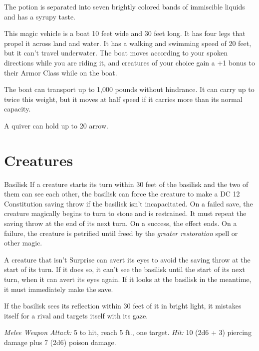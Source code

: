\documentclass[10pt,a4paper,twoside,bg=print,twocolumn,openany,nodeprecatedcode]{dndbook}
\begin{document}
The potion is separated into seven brightly colored bands of immiscible liquids and has a syrupy taste.

This magic vehicle is a boat 10 feet wide and 30 feet long. It has four legs that propel it across land and water. It has a walking and swimming speed of 20 feet, but it can't travel underwater. The boat moves according to your spoken directions while you are riding it, and creatures of your choice gain a +1 bonus to their Armor Class while on the boat.

The boat can transport up to 1,000 pounds without hindrance. It can carry up to twice this weight, but it moves at half speed if it carries more than its normal capacity.

A quiver can hold up to 20 arrow.

\chapter{Creatures}
\pagestyle{empty}

\begin{DndMonster}[float=t]{Basilisk}
\DndMonsterBasics[
armor-class = {15 (natural armor)},
hit-points = {\DndDice{8d8 + 16}},
speed = {20 ft.}
]
\DndMonsterAbilityScores[
 str = 16,
 dex = 8,
 con = 15,
 int = 2,
 wis = 8,
 cha = 7
]
\DndMonsterDetails[
senses = {darkvision 60 ft., passive perception 9},
challenge = 3,
]
If a creature starts its turn within 30 feet of the basilisk and the two of them can see each other, the basilisk can force the creature to make a DC 12 Constitution saving throw if the basilisk isn't incapacitated. On a failed save, the creature magically begins to turn to stone and is restrained. It must repeat the saving throw at the end of its next turn. On a success, the effect ends. On a failure, the creature is petrified until freed by the  \textit{greater restoration} spell or other magic.

A creature that isn't Surprise can avert its eyes to avoid the saving throw at the start of its turn. If it does so, it can't see the basilisk until the start of its next turn, when it can avert its eyes again. If it looks at the basilisk in the meantime, it must immediately make the save.

If the basilisk sees its reflection within 30 feet of it in bright light, it mistakes itself for a rival and targets itself with its gaze.

\textsl{Melee Weapon Attack:} 5 to hit, reach 5 ft., one target. \textsl{Hit:} 10 (2d6 + 3) piercing damage plus 7 (2d6) poison damage.

\end{DndMonster}
\end{document}
